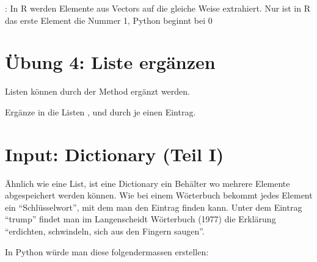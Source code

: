 \documentclass[letterpaper,10pt,english]{sphinxmanual}
\begin{document}
: In R werden Elemente aus Vectors auf die gleiche Weise extrahiert. Nur ist in R das erste Element die Nummer 1, Python beginnt bei 0


\section{Übung 4: Liste ergänzen}
\label{\detokenize{01_02_Python_Basics:ubung-4-liste-erganzen}}
Listen können durch der Method  ergänzt werden.

\begin{sphinxVerbatim}[commandchars=\\\{\}]
\end{sphinxVerbatim}

Ergänze in die Listen ,  und  durch je einen Eintrag.

\begin{sphinxVerbatim}[commandchars=\\\{\}]

\end{sphinxVerbatim}


\section{Input: Dictionary (Teil I)}
\label{\detokenize{01_02_Python_Basics:input-dictionary-teil-i}}
Ähnlich wie eine List, ist eine Dictionary ein Behälter wo mehrere Elemente abgespeichert werden können. Wie bei einem Wörterbuch bekommt jedes Element ein “Schlüsselwort”, mit dem man den Eintrag finden kann.
Unter dem Eintrag “trump” findet man im Langenscheidt Wörterbuch (1977) die Erklärung “erdichten, schwindeln, sich aus den Fingern saugen”.


In Python würde man diese  folgendermassen erstellen:

\begin{sphinxVerbatim}[commandchars=\\\{\}]
  
\end{sphinxVerbatim}
\end{document}
